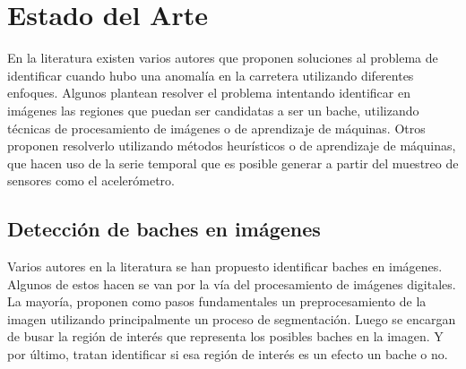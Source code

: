 \chapter{Estado del Arte}\label{chapter:state-of-the-art}
En la literatura existen varios autores que proponen soluciones al problema de identificar cuando hubo una anomalía en la carretera utilizando
diferentes enfoques. Algunos plantean resolver el problema intentando identificar en imágenes las regiones que puedan ser candidatas a ser un 
bache, utilizando  técnicas de procesamiento de imágenes o de aprendizaje de máquinas. Otros proponen resolverlo utilizando métodos heurísticos
o de aprendizaje de máquinas, que hacen uso de la serie temporal que es posible generar a partir del muestreo de sensores como el acelerómetro. 

\section{Detección de baches en imágenes}
Varios autores en la literatura se han propuesto identificar baches en imágenes. Algunos de estos hacen se van por la vía del procesamiento 
de imágenes digitales. La mayoría, proponen como pasos fundamentales un preprocesamiento de la imagen utilizando principalmente 
un proceso de segmentación. Luego se encargan de busar la región de interés que representa los posibles baches en la imagen. Y por último,
tratan identificar si esa región de interés es un efecto un bache o no. 

